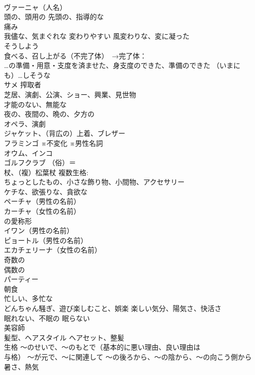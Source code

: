 \documentclass[8pt]{extreport}
\begin{document}
\begin{CJK}{UTF8}{min}
\\	ヴァーニャ（人名）
\\	頭の、頭用の 先頭の、指導的な
\\	痛み
\\	我儘な、気まぐれな 変わりやすい 風変わりな、変に凝った
\\	そうしよう
\\	食べる、召し上がる（不完了体）　→完了体：
\\	…の準備・用意・支度を済ませた、身支度のできた、準備のできた （いまにも）…しそうな
\\	サメ 搾取者
\\	芝居、演劇、公演、ショー、興業、見世物
\\	才能のない、無能な
\\	夜の、夜間の、晩の、夕方の
\\	オペラ、演劇
\\	ジャケット、（背広の）上着、ブレザー
\\	フラミンゴ ※不変化 ※男性名詞
\\	オウム、インコ
\\	ゴルフクラブ （俗）＝
\\	杖、（複）松葉杖 複数生格:
\\	ちょっとしたもの、小さな飾り物、小間物、アクセサリー
\\	ケチな、欲張りな、貪欲な
\\	ペーチャ（男性の名前）
\\	カーチャ（女性の名前） 
\\	の愛称形
\\	イワン（男性の名前）
\\	ピョートル（男性の名前）
\\	エカチェリーナ（女性の名前）
\\	奇数の
\\	偶数の
\\	パーティー
\\	朝食
\\	忙しい、多忙な
\\	どんちゃん騒ぎ、遊び楽しむこと、娯楽 楽しい気分、陽気さ、快活さ
\\	眠れない、不眠の 眠らない
\\	美容師
\\	髪型、ヘアスタイル ヘアセット、整髪
\\	生格	～のせいで、～のもとで（基本的に悪い理由、良い理由は
\\	与格） ～が元で、～に関連して ～の後ろから、～の陰から、～の向こう側から
\\	暑さ、熱気

\end{CJK}
\end{document}
